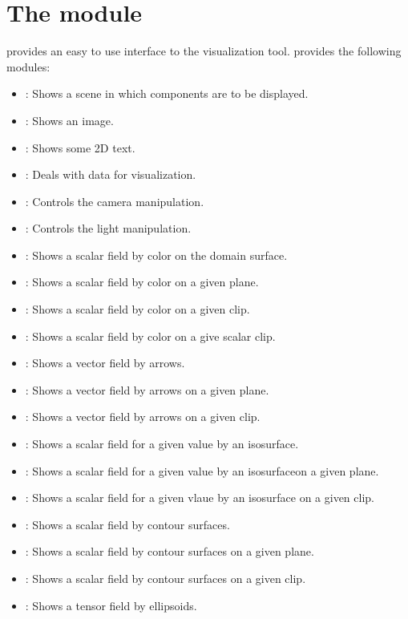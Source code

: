 \chapter{The module \pyvisi}
\label{PYVISI CHAP}


\pyvisi provides an easy to use interface to the \VTK visualization 
tool. \pyvisi provides the following modules:

\begin{itemize}
\item \Scene: Shows a scene in which components are to be displayed.
\item \Image: Shows an image.
\item \Text: Shows some 2D text.
\item \DataCollector: Deals with data for visualization.
\item \Camera: Controls the camera manipulation. 
\item \Light: Controls the light manipulation.
\item \Map: Shows a scalar field by color on the domain surface.
\item \MapOnPlane: Shows a scalar field by color on a given plane. 
\item \MapOnClip: Shows a scalar field by color on a given clip.
\item \MapOnScalarClip: Shows a scalar field by color on a give scalar clip.
\item \Arrows: Shows a vector field by arrows.
\item \ArrowsOnPlane: Shows a vector field by arrows on a given plane.
\item \ArrowsOnClip: Shows a vector field by arrows on a given clip.
\item \IsoSurface: Shows a scalar field for a given value by 
an isosurface.
\item \IsoSurfaceOnPlane: Shows a scalar field for a given value by 
an isosurfaceon a given plane.
\item \IsoSurfaceOnClip: Shows a scalar field for a given vlaue by 
an isosurface on a given clip.
\item \Contour: Shows a scalar field by contour surfaces. 
\item \ContourOnPlane: Shows a scalar field by contour surfaces on 
a given plane.
\item \ContourOnClip: Shows a scalar field by contour surfaces on 
a given clip.
\item \TensorC: Shows a tensor field by ellipsoids.

\end{itemize}
